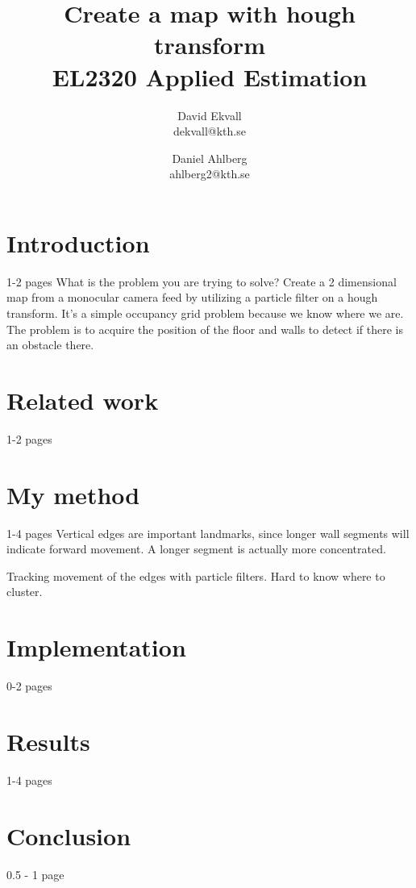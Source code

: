 \documentclass[a4paper,11pt]{article}
\title{
	Create a map with hough transform\\
	EL2320 Applied Estimation
}
\author{
	David Ekvall\\
	dekvall@kth.se\\
	\and
	Daniel Ahlberg\\
	ahlberg2@kth.se\\
}
\begin{document}
\maketitle
{}

\section{Introduction}
1-2 pages
What is the problem you are trying to solve?
Create a 2 dimensional map from a monocular camera feed by utilizing a particle filter on a hough transform. It's a simple occupancy grid problem because we know where we are. The problem is to acquire the position of the floor and walls to detect if there is an obstacle there. 

\section{Related work}
1-2 pages \cite{reed2016generative}

\section{My method}
1-4 pages
Vertical edges are important landmarks, since longer wall segments will indicate forward movement. A longer segment is actually more concentrated. 

Tracking movement of the edges with particle filters. Hard to know where to cluster. 

\section{Implementation}
0-2 pages

\section{Results}
1-4 pages

\section{Conclusion}
0.5 - 1 page

\printbibliography
\end{document}
